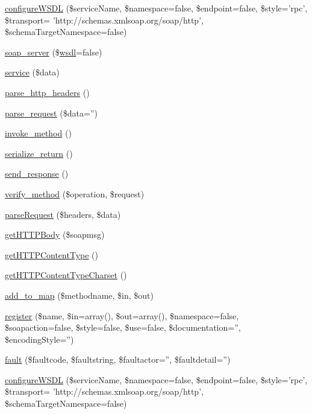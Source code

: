 \begin{DoxyCompactItemize}
\item 
\hyperlink{classsoap__server_a569306e1dcc17e55d737ef6096709e65}{configure\-W\-S\-D\-L} (\$service\-Name, \$namespace=false, \$endpoint=false, \$style='rpc', \$transport= 'http\-://schemas.\-xmlsoap.\-org/soap/http', \$schema\-Target\-Namespace=false)
\item 
\hyperlink{classsoap__server_a190cf678e3d912843f6e7442c25b5ccb}{soap\-\_\-server} (\$\hyperlink{classwsdl}{wsdl}=false)
\item 
\hyperlink{classsoap__server_ad91e2ca0020e1192392077915db92e41}{service} (\$data)
\item 
\hyperlink{classsoap__server_aa7d62dcdbc6b24667691c66700bec2ea}{parse\-\_\-http\-\_\-headers} ()
\item 
\hyperlink{classsoap__server_ac1c98672ed25f0f3b8a7470a342f45c0}{parse\-\_\-request} (\$data='')
\item 
\hyperlink{classsoap__server_afa0f240a77cba882ddb1096255aaa88c}{invoke\-\_\-method} ()
\item 
\hyperlink{classsoap__server_a2d107db4f89e00b4028dbfb2827c40dd}{serialize\-\_\-return} ()
\item 
\hyperlink{classsoap__server_a5639906d44165650fa1ee610f2435e89}{send\-\_\-response} ()
\item 
\hyperlink{classsoap__server_a6621bf070937d91b20824bceedac26f4}{verify\-\_\-method} (\$operation, \$request)
\item 
\hyperlink{classsoap__server_a7a69990540b6dc277f2775abd40772a1}{parse\-Request} (\$headers, \$data)
\item 
\hyperlink{classsoap__server_ab1e22b0858bdbe61d2d711ff442c0e78}{get\-H\-T\-T\-P\-Body} (\$soapmsg)
\item 
\hyperlink{classsoap__server_a2bed19ef2d537dee244535339cd6026a}{get\-H\-T\-T\-P\-Content\-Type} ()
\item 
\hyperlink{classsoap__server_a9051db33a9b7e50315d9222ef1c52ce9}{get\-H\-T\-T\-P\-Content\-Type\-Charset} ()
\item 
\hyperlink{classsoap__server_ad2e47223401828fb5e5fe54733abaf9a}{add\-\_\-to\-\_\-map} (\$methodname, \$in, \$out)
\item 
\hyperlink{classsoap__server_a17b5ba99bab794b0a9584592f6e23b04}{register} (\$name, \$in=array(), \$out=array(), \$namespace=false, \$soapaction=false, \$style=false, \$use=false, \$documentation='', \$encoding\-Style='')
\item 
\hyperlink{classsoap__server_ac6a9b7aaeeeecd1e365f8846d4bfc2d9}{fault} (\$faultcode, \$faultstring, \$faultactor='', \$faultdetail='')
\item 
\hyperlink{classsoap__server_a569306e1dcc17e55d737ef6096709e65}{configure\-W\-S\-D\-L} (\$service\-Name, \$namespace=false, \$endpoint=false, \$style='rpc', \$transport= 'http\-://schemas.\-xmlsoap.\-org/soap/http', \$schema\-Target\-Namespace=false)
\end{DoxyCompactItemize}
